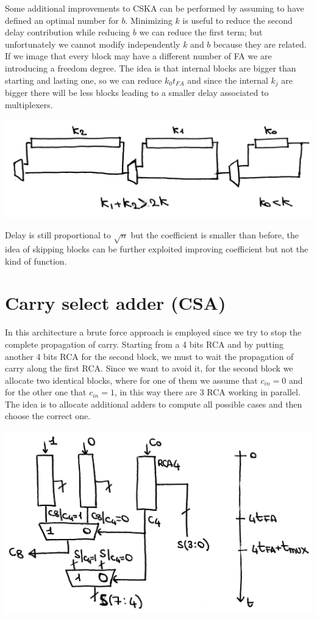 Some additional improvements to CSKA can be performed by assuming to have defined an optimal number for $b$. Minimizing $k$ is useful to reduce the second delay contribution while reducing $b$ we can reduce the first term; but unfortunately we cannot modify independently $k$ and $b$ because they are related. If we image that every block may have a different number of FA we are introducing a freedom degree. The idea is that internal blocks are bigger than starting and lasting one, so we can reduce $k_0t_{FA}$ and since the internal $k_j$ are bigger there will be less blocks leading to a smaller delay associated to multiplexers.
\begin{center}
  \includegraphics[width=0.7\linewidth]{img/img2/6}
\end{center}


Delay is still proportional to $\sqrt{n}$ but the coefficient is smaller than before, the idea of skipping blocks can be further exploited improving coefficient but not the kind of function.

 \section{Carry select adder (CSA)}
 In this architecture a brute force approach is employed since we try to stop the complete propagation of carry. Starting from a 4 bits RCA and by putting another 4 bits RCA for the second block, we must to wait the propagation of carry along the first RCA. Since we want to avoid it, for the second block we allocate two identical blocks, where for one of them we assume that $c_{in}=0$ and for the other one that $c_{in}=1$, in this way there are 3 RCA working in parallel. The idea is to allocate additional adders to compute all possible cases and then choose the correct one.

\begin{center}
  \includegraphics[width=0.7\linewidth]{img/img2/7}
\end{center}


